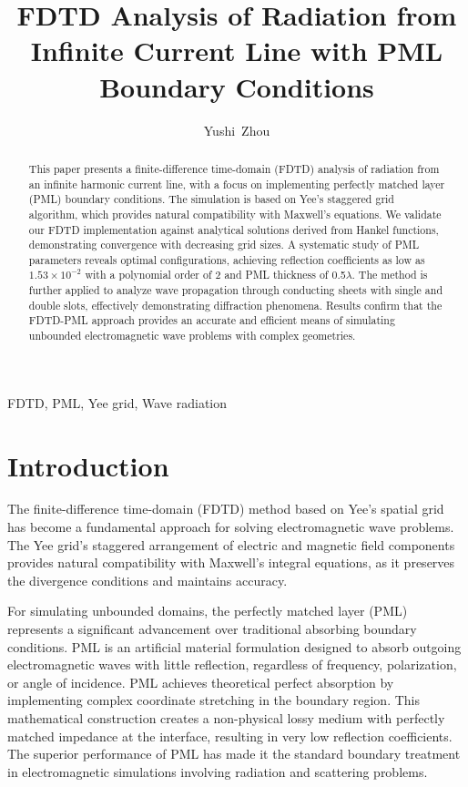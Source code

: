 \documentclass[journal]{IEEEtran}
\begin{document}
\title{FDTD Analysis of Radiation from Infinite Current Line with PML Boundary Conditions}
\author{Yushi~Zhou}
\maketitle

\begin{abstract}
This paper presents a finite-difference time-domain (FDTD) analysis of radiation from an infinite harmonic current line, 
with a focus on implementing perfectly matched layer (PML) boundary conditions. The simulation is based on Yee's staggered grid algorithm, 
which provides natural compatibility with Maxwell's equations. We validate our FDTD implementation against analytical solutions 
derived from Hankel functions, demonstrating convergence with decreasing grid sizes. 
A systematic study of PML parameters reveals optimal configurations, achieving reflection coefficients as low as 
$1.53 \times 10^{-2}$ with a polynomial order of 2 and PML thickness of 0.5$\lambda$. 
The method is further applied to analyze wave propagation through conducting sheets with single and double slots, 
effectively demonstrating diffraction phenomena. Results confirm that the FDTD-PML approach provides 
an accurate and efficient means of simulating unbounded electromagnetic wave problems with complex geometries.
\end{abstract}

\begin{IEEEkeywords}
FDTD, PML, Yee grid,  Wave radiation
\end{IEEEkeywords}

\section{Introduction}
The finite-difference time-domain (FDTD) method based on Yee's spatial grid \cite{yee1966numerical} has become a fundamental approach for solving electromagnetic wave problems. 
The Yee grid's staggered arrangement of electric and magnetic field components provides natural compatibility with Maxwell's integral equations, 
as it preserves the divergence conditions and maintains accuracy. 

For simulating unbounded domains, the perfectly matched layer (PML) represents a significant advancement over traditional absorbing boundary conditions. 
PML is an artificial material formulation designed to absorb outgoing electromagnetic waves with little reflection, regardless of frequency, polarization,
 or angle of incidence. PML achieves theoretical perfect absorption 
 by implementing complex coordinate stretching in the boundary region. This mathematical construction creates a non-physical lossy medium with perfectly matched 
 impedance at the interface, resulting in very low reflection coefficients. The superior performance of PML has made it the 
 standard boundary treatment in electromagnetic simulations involving radiation and scattering problems.
\end{document}
